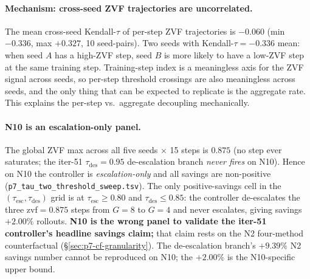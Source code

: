 \paragraph{Mechanism: cross-seed ZVF trajectories are
uncorrelated.}
The mean cross-seed Kendall-$\tau$ of per-step ZVF
trajectories is $-0.060$ (min $-0.336$, max $+0.327$, 10
seed-pairs).  Two seeds with Kendall-$\tau = -0.336$ mean:
when seed $A$ has a high-ZVF step, seed $B$ is more likely
to have a low-ZVF step at the same training step.
Training-step index is a meaningless axis for the ZVF
signal across seeds, so per-step threshold crossings are
also meaningless across seeds, and the only thing that
can be expected to replicate is the aggregate rate.
This explains the per-step vs.\ aggregate decoupling
mechanically.

\paragraph{N10 is an escalation-only panel.}
The global ZVF max across all five seeds $\times$ 15 steps
is $0.875$ (no step ever saturates; the iter-51
$\tau_{\mathrm{des}}{=}0.95$ de-escalation branch \emph{never
fires} on N10).  Hence on N10 the controller is
\emph{escalation-only} and all savings are non-positive
(\texttt{p7\_tau\_two\_threshold\_sweep.tsv}).  The only
positive-savings cell in the $(\tau_{\mathrm{esc}},
\tau_{\mathrm{des}})$ grid is at
$\tau_{\mathrm{esc}} \geq 0.80$ and $\tau_{\mathrm{des}}
\leq 0.85$: the controller de-escalates the three
zvf${=}0.875$ steps from $G{=}8$ to $G{=}4$ and never
escalates, giving savings $\mathbf{+2.00\%}$ rollouts.
\textbf{N10 is the wrong panel to validate the iter-51
controller's headline savings claim;} that claim rests
on the N2 four-method counterfactual
(\S\ref{sec:p7-cf-granularity}).  The de-escalation
branch's $+9.39\%$ N2 savings number cannot be reproduced
on N10; the $+2.00\%$ is the N10-specific upper bound.

